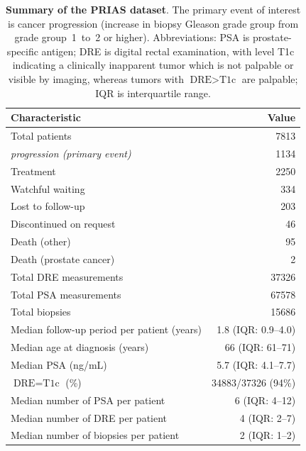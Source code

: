 \begin{table}
\small
\centering
\caption{\textbf{Summary of the PRIAS dataset}. The primary event of interest is cancer progression (increase in biopsy Gleason grade group from grade group~1~to~2 or higher). Abbreviations: PSA is prostate-specific antigen; DRE is digital rectal examination, with level T1c~\citep{schroder1992tnm} indicating a clinically inapparent tumor which is not palpable or visible by imaging, whereas tumors with $\mbox{DRE} > \mbox{T1c}$ are palpable; IQR is interquartile range.}
\label{table:prias_summary}
\begin{tabular}{lr}
\hline
\hline
\textbf{Characteristic} &  \textbf{Value}\\
\hline
Total patients &  7813\\
\textit{progression (primary event)}  & 1134\\
Treatment  &  2250\\
Watchful waiting   & 334\\
Lost to follow-up   & 203\\
Discontinued on request   & 46\\
Death (other)   & 95\\
Death (prostate cancer)   & 2\\
\hline
Total DRE measurements & 37326 \\
Total PSA measurements  & 67578\\
Total biopsies & 15686\\
\hline
Median follow-up period per patient (years)   &  1.8 (IQR: 0.9--4.0)\\
Median age at diagnosis (years)   & 66 (IQR: 61--71)\\
Median PSA (ng/mL) & 5.7 (IQR: 4.1--7.7)\\
$\mbox{DRE} = \mbox{T1c}$ (\%)  & 34883/37326 (94\%) \\
\hline
Median number of PSA per patient   &  6 (IQR: 4--12)\\
Median number of DRE per patient & 4 (IQR: 2--7)\\
Median number of biopsies per patient  &  2 (IQR: 1--2)\\
\hline
\end{tabular}
\end{table}
 
